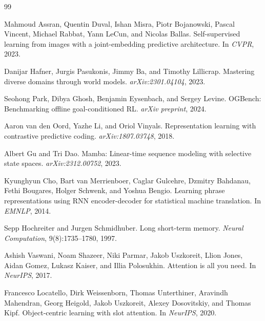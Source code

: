 
\begin{thebibliography}{99}
\setlength{\itemsep}{1pt}

Mahmoud Assran, Quentin Duval, Ishan Misra, Piotr Bojanowski, Pascal Vincent,
Michael Rabbat, Yann LeCun, and Nicolas Ballas.
\newblock Self-supervised learning from images with a joint-embedding
predictive architecture.
\newblock In \emph{CVPR}, 2023.

Danijar Hafner, Jurgis Pasukonis, Jimmy Ba, and Timothy Lillicrap.
\newblock Mastering diverse domains through world models.
\newblock \emph{arXiv:2301.04104}, 2023.

Seohong Park, Dibya Ghosh, Benjamin Eysenbach, and Sergey Levine.
\newblock OGBench: Benchmarking offline goal-conditioned RL.
\newblock \emph{arXiv preprint}, 2024.

Aaron van den Oord, Yazhe Li, and Oriol Vinyals.
\newblock Representation learning with contrastive predictive coding.
\newblock \emph{arXiv:1807.03748}, 2018.

Albert Gu and Tri Dao.
\newblock Mamba: Linear-time sequence modeling with selective state spaces.
\newblock \emph{arXiv:2312.00752}, 2023.

Kyunghyun Cho, Bart van Merrienboer, Caglar Gulcehre, Dzmitry Bahdanau,
Fethi Bougares, Holger Schwenk, and Yoshua Bengio.
\newblock Learning phrase representations using RNN encoder-decoder for
statistical machine translation.
\newblock In \emph{EMNLP}, 2014.

Sepp Hochreiter and Jurgen Schmidhuber.
\newblock Long short-term memory.
\newblock \emph{Neural Computation}, 9(8):1735--1780, 1997.

Ashish Vaswani, Noam Shazeer, Niki Parmar, Jakob Uszkoreit, Llion Jones,
Aidan Gomez, Lukasz Kaiser, and Illia Polosukhin.
\newblock Attention is all you need.
\newblock In \emph{NeurIPS}, 2017.

Francesco Locatello, Dirk Weissenborn, Thomas Unterthiner, Aravindh
Mahendran, Georg Heigold, Jakob Uszkoreit, Alexey Dosovitskiy, and Thomas
Kipf.
\newblock Object-centric learning with slot attention.
\newblock In \emph{NeurIPS}, 2020.


\end{thebibliography}
